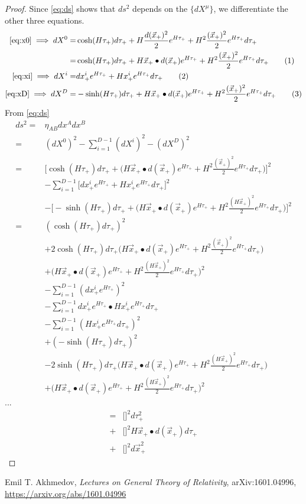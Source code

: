 \documentclass[]{article}
\newcommand\numberthis{\addtocounter{equation}{1}\tag{\theequation}}
\begin{document}
\begin{proof}
	Since \eqref{eq:ds} shows that $ds^2$ depends on the $\{dX^{\mu}\}$, we differentiate the other three equations.
	\begin{align*}
	\text{\eqref{eq:x0}}\implies dX^0=&\cosh(H\tau_+)d\tau_+ +H\frac{d(\vec{x}_+)^2}{2}e^{H\tau_+}+H^2\frac{(\vec{x}_+)^2}{2}e^{H\tau_+}d\tau_+\\
	=&\cosh(H\tau_+)d\tau_+ +H\vec{x}_+\bullet d(\vec{x}_+)e^{H\tau_+}+H^2\frac{(\vec{x}_+)^2}{2}e^{H\tau_+}d\tau_+\numberthis\label{eq:dx0}\\
	\eqref{eq:xi}\implies	dX^i=&dx^i_+e^{H\tau_+} + H x^i_+e^{H\tau_+}d\tau_+\numberthis\label{eq:dxi}\\
	\eqref{eq:xD}\implies dX^D=&-\sinh(H\tau_+)d\tau_+ +H\vec{x}_+\bullet d(\vec{x}_+)e^{H\tau_+} +H^2 \frac{(\vec{x}_+)^2}{2}e^{H\tau_+}d\tau_+ \numberthis\label{eq:dxD}
	\end{align*}
	From \eqref{eq:ds}
	\begin{align*}
	ds^2=&\eta_{AB}dx^Adx^B\\
	=&(dX^0)^2- \sum_{i=1}^{D-1}(dX^i)^2-(dX^D)^2\\
	=&\bigg[\cosh(H\tau_+)d\tau_+ +\big(H\vec{x}_+\bullet d(\vec{x}_+)e^{H\tau_+}+H^2\frac{(\vec{x}_+)^2}{2}e^{H\tau_+}d\tau_+\big)\bigg]^2\\
	&- \sum_{i=1}^{D-1}\bigg[dx^i_+e^{H\tau_+} + H x^i_+e^{H\tau_+}d\tau_+\bigg]^2\\
	&-\bigg[-\sinh(H\tau_+)d\tau_+ +\big(H\vec{x}_+\bullet d(\vec{x}_+)e^{H\tau_+} +H^2\frac{(H\vec{x}_+)^2}{2}e^{H\tau_+}d\tau_+\big)\bigg]^2\\
	=& (\cosh(H\tau_+)d\tau_+)^2 \\
	&+ 2 \cosh(H\tau_+)d\tau_+ \big(H\vec{x}_+\bullet d(\vec{x}_+)e^{H\tau_+}+H^2\frac{(\vec{x}_+)^2}{2}e^{H\tau_+}d\tau_+\big)\\ &+\big(H\vec{x}_+\bullet d(\vec{x}_+)e^{H\tau_+} +H^2\frac{(H\vec{x}_+)^2}{2}e^{H\tau_+}d\tau_+\big)^2\\
	&- \sum_{i=1}^{D-1}(dx^i_+e^{H\tau_+})^2\\
	&- \sum_{i=1}^{D-1}dx^i_+e^{H\tau_+} \bullet H x^i_+e^{H\tau_+}d\tau_+\\
	&- \sum_{i=1}^{D-1}(H x^i_+e^{H\tau_+}d\tau_+)^2\\
	&+ (-\sinh(H\tau_+)d\tau_+ )^2\\
	&- 2 \sinh(H\tau_+)d\tau_+ \big(H\vec{x}_+\bullet d(\vec{x}_+)e^{H\tau_+} +H^2\frac{(H\vec{x}_+)^2}{2}e^{H\tau_+}d\tau_+\big) \\
	&+ \big(H\vec{x}_+\bullet d(\vec{x}_+)e^{H\tau_+} +H^2\frac{(H\vec{x}_+)^2}{2}e^{H\tau_+}d\tau_+\big)^2
	\end{align*}
	...
	\begin{align*}
	=&\big[\big]^2 d\tau_+^2\\
	+&\big[\big]^2H\vec{x}_+\bullet d(\vec{x}_+)d\tau_+\\
	+&\big[\big]^2d\vec{x}^2_+
	\end{align*}
\end{proof}
\begin{thebibliography}{9}\label{section:biblio}
	\raggedright
	Emil T. Akhmedov,
	\emph{Lectures on General Theory of Relativity},
	arXiv:1601.04996,
	\url{https://arxiv.org/abs/1601.04996}
\end{thebibliography}
\end{document}
